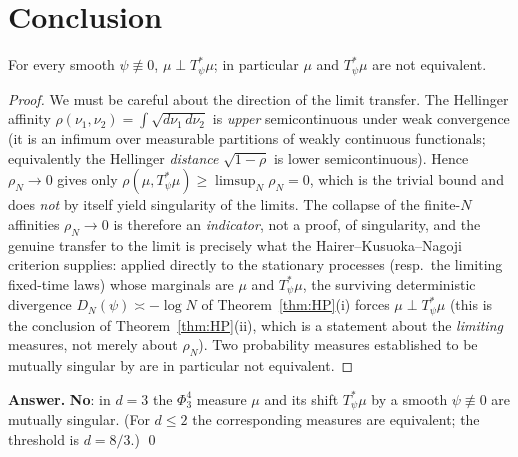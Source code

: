 \section*{Conclusion}

\begin{qonetheorem}\label{thm:main}
For every smooth $\psi\not\equiv0$, $\mu\perp T_\psi^*\mu$; in particular $\mu$ and
$T_\psi^*\mu$ are not equivalent.
\end{qonetheorem}
\begin{proof}
We must be careful about the direction of the limit transfer. The Hellinger affinity
$\rho(\nu_1,\nu_2)=\int\sqrt{d\nu_1\,d\nu_2}$ is \emph{upper} semicontinuous under weak
convergence (it is an infimum over measurable partitions of weakly continuous
functionals; equivalently the Hellinger \emph{distance} $\sqrt{1-\rho}$ is lower
semicontinuous). Hence $\rho_N\to0$ gives only $\rho(\mu,T_\psi^*\mu)\ge\limsup_N\rho_N=0$,
which is the trivial bound and does \emph{not} by itself yield singularity of the limits.
The collapse of the finite-$N$ affinities $\rho_N\to0$ is therefore an \emph{indicator},
not a proof, of singularity, and the genuine transfer to the limit is precisely what the
Hairer--Kusuoka--Nagoji criterion \cite{HKN24} supplies: applied directly to the
stationary processes (resp.\ the limiting fixed-time laws) whose marginals are $\mu$ and
$T_\psi^*\mu$, the surviving deterministic divergence $D_N(\psi)\asymp-\log N$ of
Theorem~\ref{thm:HP}(i) forces $\mu\perp T_\psi^*\mu$ (this is the conclusion of
Theorem~\ref{thm:HP}(ii), which is a statement about the \emph{limiting} measures, not
merely about $\rho_N$). Two probability measures established to be mutually singular by
\cite{HKN24,HP25} are in particular not equivalent.
\end{proof}

\medskip
\noindent\textbf{Answer.} \textbf{No}: in $d=3$ the $\Phi^4_3$ measure $\mu$ and its
shift $T_\psi^*\mu$ by a smooth $\psi\not\equiv0$ are mutually singular. (For $d\le2$
the corresponding measures are equivalent; the threshold is $d=8/3$.)
\qed

